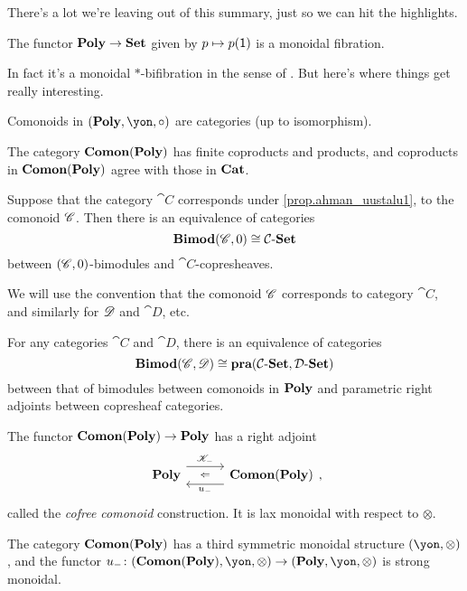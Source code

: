 \documentclass[DynamicalBook]{subfiles}
\begin{document}
There's a lot we're leaving out of this summary, just so we can hit the highlights.

\begin{proposition}
The functor $\textbf{Poly}\to\textbf{Set}$ given by $p\mapsto p(\textsf{1})$ is a monoidal fibration.
\end{proposition}

In fact it's a monoidal $*$-bifibration in the sense of \cite{shulman2008framed}. But here's where things get really interesting.

\begin{proposition}\label{prop.ahman_uustalu1}
Comonoids in $(\poly,\yon,\circ)$ are categories (up to isomorphism).
\end{proposition}

\begin{proposition}[Niu]
The category $\textbf{Comon}(\textbf{Poly})$ has finite coproducts and products, and coproducts in $\textbf{Comon}(\textbf{Poly})$ agree with those in $\textbf{Cat}$.
\end{proposition}

\begin{proposition}
Suppose that the category $\cat{C}$ corresponds under \cref{prop.ahman_uustalu1}, to the comonoid $\mathscr{C}$. Then there is an equivalence of categories
\[
\textbf{Bimod}(\mathscr{C},0)\cong\mathcal{C}\textnormal{-}\textbf{Set}
\]
between $(\mathscr{C},0)$-bimodules and $\cat{C}$-copresheaves.
\end{proposition}
We will use the convention that the comonoid $\mathscr{C}$ corresponds to category $\cat{C}$, and similarly for $\mathscr{D}$ and $\cat{D}$, etc. 

\begin{proposition}[Garner]
For any categories $\cat{C}$ and $\cat{D}$, there is an equivalence of categories
\[
\textbf{Bimod}(\mathscr{C},\mathscr{D})\cong\textbf{pra}(\mathcal{C}\textnormal{-}\textbf{Set},\mathcal{D}\textnormal{-}\textbf{Set})
\]
between that of bimodules between comonoids in $\textbf{Poly}$ and parametric right adjoints between copresheaf categories.
\end{proposition}

\begin{proposition}
The functor $\textbf{Comon}(\textbf{Poly})\to\textbf{Poly}$ has a right adjoint
\[
\adjr{\poly}{\com{K}_-}{u_-}{\comon},
\]
called the \emph{cofree comonoid} construction. It is lax monoidal with respect to $\otimes$.
\end{proposition}

\begin{proposition}
The category $\textbf{Comon}(\textbf{Poly})$ has a third symmetric monoidal structure $(\yon,\otimes)$, and the functor $u_-\colon(\comon,\yon,\otimes)\to(\poly,\yon,\otimes)$ is strong monoidal.
\end{proposition}
\end{document}

